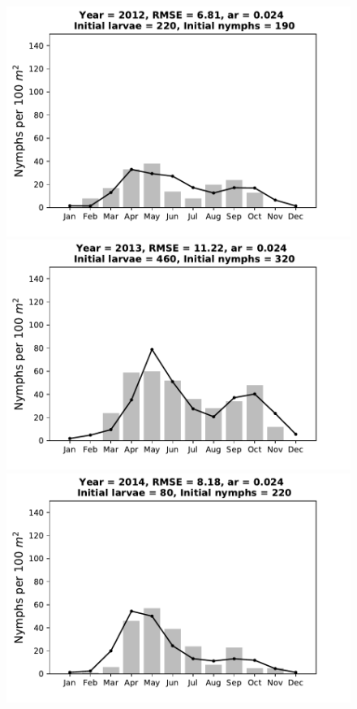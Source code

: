\documentclass[a4paper, 11pt]{scrartcl}
\begin{document}
\begin{figure}[h!]
\begin{minipage}[c]{0.40\linewidth}
\end{minipage}
\begin{minipage}[c]{0.40\linewidth}
\includegraphics[width=\linewidth]{figures/s4/S4_2012}
\end{minipage}
\begin{minipage}[c]{0.40\linewidth}
\includegraphics[width=\linewidth]{figures/s4/S4_2013}
\end{minipage}
\begin{minipage}[c]{0.40\linewidth}
\includegraphics[width=\linewidth]{figures/s4/S4_2014}

\end{minipage}
\end{figure}
\end{document}
